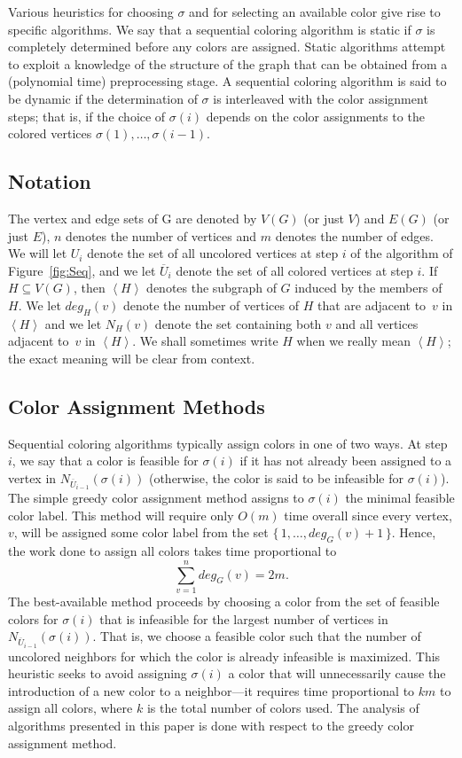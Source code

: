 Various heuristics for choosing $\sigma$ and for selecting an available color 
give rise to specific algorithms. We say that a sequential coloring algorithm is
static if $\sigma$ is completely determined before any colors are assigned. 
Static algorithms attempt to exploit a knowledge of the structure of the
graph that can be obtained from a (polynomial time) preprocessing stage.  A
sequential coloring algorithm is said to be dynamic if the determination 
of $\sigma$ is interleaved with the color assignment steps; that is, if the
choice of $\sigma(i)$ depends on the color assignments to the colored
vertices $\sigma(1), \ldots , \sigma(i-1)$.  

\subsection{Notation}
The vertex and edge sets of G are denoted by $V(G)$ (or just $V$)
and $E(G)$ (or just $E$), $n$ denotes the number of vertices and
$m$ denotes the number of edges.
We will let $U_i$ denote the set of all uncolored vertices 
at step $i$ of the algorithm of Figure~\ref{fig:Seq}, and we let
$\overline{U}_i$ denote the set of all colored vertices at step $i$.
If $H \subseteq V(G)$, then $\left < H \right >$ denotes the subgraph of $G$
induced by the members of $H$.  We let $deg_H(v)$ denote the number of
vertices of $H$ that are adjacent to~$v$ in $\left < H \right >$ and 
we let $N_H(v)$ denote the set containing both $v$ and 
all vertices adjacent to~$v$ in $\left< H \right>$.
We shall sometimes write $H$ when we really mean $\left < H \right >$; 
the exact meaning will be clear from context.

\subsection{Color Assignment Methods}
Sequential coloring algorithms typically assign colors in one of two ways.  
At step $i$, we say that a color is feasible for $\sigma(i)$ if it has not
already been assigned to a vertex in $N_{\overline{U}_{i-1}} (\sigma(i))$
(otherwise, the color is said to be infeasible for $\sigma(i)$).  The simple
greedy color assignment method assigns to $\sigma(i)$ the minimal feasible 
color label.  This method will require only $O(m)$ time overall since
every vertex, $v$, will be
assigned some color label from the set $\{\,1, \ldots , deg_G(v)+1 \,\}$. Hence,
the work done to assign all colors takes time proportional to
\[
\sum_{v=1}^{n} deg_G(v) = 2m .
\]
The best-available method proceeds by choosing a color from the set of
feasible colors for $\sigma(i)$ that is infeasible for the largest number of 
vertices in $N_{\overline{U}_{i-1}} (\sigma(i))$. That is,
we choose a feasible color such that the number of uncolored neighbors for
which the color is already infeasible is maximized.  This heuristic seeks to
avoid assigning $\sigma(i)$ a color that will unnecessarily cause the
introduction of a new color to a neighbor---it requires time proportional to 
$km$ to assign all colors, where $k$ is the total number of colors used.  
The analysis of algorithms presented in this paper 
is done with respect to the greedy color assignment method.
 
